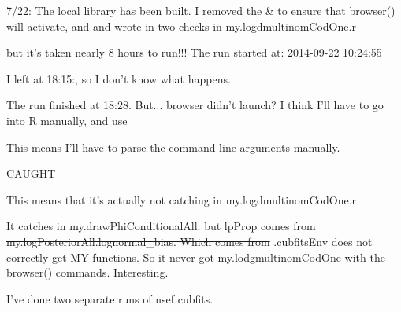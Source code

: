 7/22: The local library has been built. I removed the \& to ensure that browser() will activate, and and wrote in two checks in my.logdmultinomCodOne.r



but it's taken nearly 8 hours to run!!! The run started at: 2014-09-22 10:24:55 

I left at 18:15:, so I don't know what happens.

The run finished at 18:28. But... browser didn't launch? I think I'll have to go into R manually, and use



This means I'll have to parse the command line arguments manually.


CAUGHT



This means that it's actually not catching in my.logdmultinomCodOne.r

It catches in my.drawPhiConditionalAll. \sout{but lpProp comes from my.logPosteriorAll.lognormal\_bias. Which comes from} .cubfitsEnv does not correctly get MY functions. So it never got my.lodgmultinomCodOne with the browser() commands. Interesting.

I've done two separate runs of nsef cubfits.

